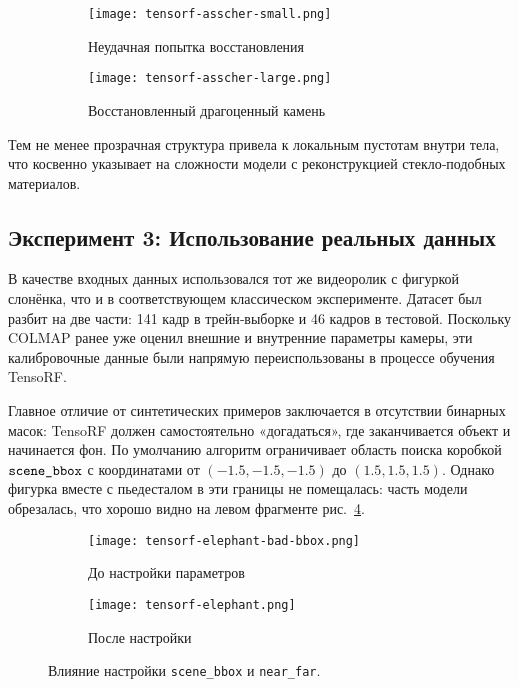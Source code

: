 \begin{figure}[h]
    \centering
    \begin{subfigure}[h]{0.45\textwidth}
      \centering
      \texttt{[image: tensorf-asscher-small.png]}
      \caption{Неудачная попытка восстановления}
      \label{fig:tensorf-asscher-small}
    \end{subfigure}\hfill
    \begin{subfigure}[h]{0.45\textwidth}
     \centering
      \texttt{[image: tensorf-asscher-large.png]}
      \caption{Восстановленный драгоценный камень}
      \label{fig:tensorf-asscher-large}
    \end{subfigure}
    \caption{}
\end{figure}

Тем не менее прозрачная структура
привела к локальным пустотам внутри тела,
что косвенно указывает на сложности модели
с реконструкцией стекло‑подобных материалов.

\subsection{Эксперимент 3: Использование реальных данных}

В качестве входных данных использовался тот же видеоролик с фигуркой
слонёнка, что и в соответствующем классическом эксперименте.
Датасет был разбит на две части: 141 кадр в трейн‑выборке
и 46 кадров в тестовой. Поскольку COLMAP ранее уже оценил
внешние и внутренние параметры камеры, эти калибровочные
данные были напрямую переиспользованы в процессе обучения TensoRF.

Главное отличие от синтетических примеров заключается в отсутствии
бинарных масок: TensoRF должен самостоятельно «догадаться»,
где заканчивается объект и начинается фон. По умолчанию
алгоритм ограничивает область поиска коробкой
$\verb|scene_bbox|$ с координатами от $(-1.5,-1.5,-1.5)$
до $(1.5,1.5,1.5)$. Однако фигурка вместе с пьедесталом в эти
границы не помещалась: часть модели обрезалась, что хорошо видно
на левом фрагменте рис.~\ref{fig:tensorf_real}.

\begin{figure}[h]
    \centering
    \begin{subfigure}[b]{0.45\textwidth}
        \centering
        \texttt{[image: tensorf-elephant-bad-bbox.png]}
        \caption{До настройки параметров}
    \end{subfigure}\hfill
    \begin{subfigure}[b]{0.45\textwidth}
        \centering
        \texttt{[image: tensorf-elephant.png]}
        \caption{После настройки}
    \end{subfigure}
    \caption{Влияние настройки \texttt{scene\_bbox} и \texttt{near\_far}.}
    \label{fig:tensorf_real}
\end{figure}

